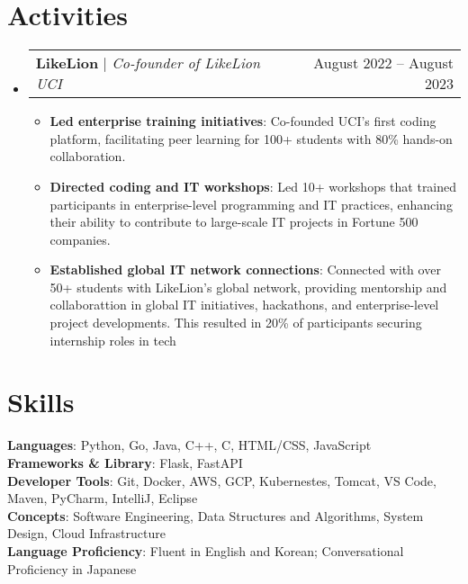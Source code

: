 \documentclass[letterpaper,11pt]{article}
\makeatletter
\newcommand{\resumeItem}[1]{
  \item\small{
    {#1 \vspace{-2pt}}
  }
}
\newcommand{\resumeActivitiesHeading}[2]{
    \item
    \begin{tabular*}{0.97\textwidth}{l@{\extracolsep{\fill}}r}
      \small#1 & #2 \\
    \end{tabular*}\vspace{-7pt}
}
\newcommand{\resumeSubHeadingListStart}{\begin{itemize}[leftmargin=0.15in, label={}]}
\newcommand{\resumeSubHeadingListEnd}{\end{itemize}}
\newcommand{\resumeItemListStart}{\begin{itemize}}
\newcommand{\resumeItemListEnd}{\end{itemize}\vspace{-5pt}}
\makeatother
\begin{document}
%

\section{Activities}
    \resumeSubHeadingListStart
      \resumeActivitiesHeading
          {\textbf{LikeLion} $|$ \emph{Co-founder of LikeLion UCI}}{August 2022 -- August 2023}
          \resumeItemListStart
            \resumeItem{\textbf{Led enterprise training initiatives}: Co-founded UCI’s first coding platform, facilitating peer learning for 100+ students with 80\% hands-on collaboration.}
            \resumeItem{\textbf{Directed coding and IT workshops}: Led 10+ workshops that trained participants in enterprise-level programming and IT practices, enhancing their ability to contribute to large-scale IT projects in Fortune 500 companies.}
            \resumeItem{\textbf{Established global IT network connections}: Connected with over 50+ students with LikeLion's global network, providing mentorship and collaborattion in global IT initiatives, hackathons, and enterprise-level project developments. This resulted in 20\% of participants securing internship roles in tech}
          \resumeItemListEnd
    \resumeSubHeadingListEnd

%

\section{Skills}
 \begin{itemize}[leftmargin=0.15in, label={}]
    \small{\item{
     \textbf{Languages}{: Python, Go, Java, C++, C, HTML/CSS, JavaScript} \\
     \textbf{Frameworks \& Library}{: Flask, FastAPI} \\
     \textbf{Developer Tools}{: Git, Docker, AWS, GCP, Kubernestes, Tomcat, VS Code, Maven, PyCharm, IntelliJ, Eclipse} \\
     \textbf{Concepts}{: Software Engineering, Data Structures and Algorithms, System Design, Cloud Infrastructure}\\
     \textbf{Language Proficiency}{: Fluent in English and Korean; Conversational Proficiency in Japanese}

    }}
 \end{itemize}


\end{document}
